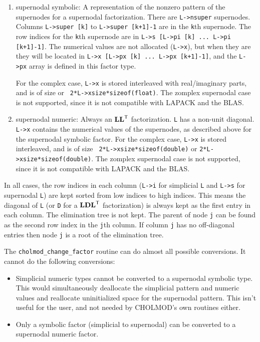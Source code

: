 \documentclass[11pt]{article}
\newcommand{\m}[1]{{\bf{#1}}}       %
\newcommand{\tr}{^{\sf T}}          %
\begin{document}
\begin{enumerate}
\item supernodal symbolic:  A representation of the nonzero pattern of the
    supernodes for a supernodal factorization.  There are {\tt L->nsuper}
    supernodes.  Columns {\tt L->super [k]} to {\tt L->super [k+1]-1} are in
    the {\tt k}th supernode.  The row indices for the {\tt k}th supernode are
    in {\tt L->s [L->pi [k] ... L->pi [k+1]-1]}.  The numerical values are not
    allocated ({\tt L->x}), but when they are they will be located in {\tt L->x
    [L->px [k] ... L->px [k+1]-1]}, and the {\tt L->px} array is defined in
    this factor type.

    For the complex case, {\tt L->x} is stored interleaved with real/imaginary
    parts, and is of size  or {\tt
    2*L->xsize*sizeof(float)}. The zomplex supernodal case is not
    supported, since it is not compatible with LAPACK and the BLAS.

\item supernodal numeric:  Always an $\m{LL}\tr$ factorization.  {\tt L} has a
    non-unit diagonal.  {\tt L->x} contains the numerical values of the
    supernodes, as described above for the supernodal symbolic factor.  For the
    complex case, {\tt L->x} is stored interleaved, and is of size {\tt
    2*L->xsize*sizeof(double)} or {\tt 2*L->xsize*sizeof(double)}.  The zomplex
    supernodal case is not supported, since it is not compatible with LAPACK
    and the BLAS.

\end{enumerate}


In all cases, the row indices in each column ({\tt L->i} for simplicial {\tt L}
and {\tt L->s} for supernodal {\tt L}) are kept sorted from low indices to high
indices.  This means the diagonal of {\tt L} (or {\tt D} for a $\m{LDL}\tr$
factorization) is always kept as the first entry in each column.  The
elimination tree is not kept.  The parent of node {\tt j} can be found as the
second row index in the {\tt j}th column.  If column {\tt j} has no
off-diagonal entries then node {\tt j} is a root of the elimination tree.

The {\tt cholmod\_change\_factor} routine can do almost all possible
conversions.  It cannot do the following conversions:

\begin{itemize}
\item Simplicial numeric types cannot be converted to a supernodal
    symbolic type.  This would simultaneously deallocate the
    simplicial pattern and numeric values and reallocate uninitialized
    space for the supernodal pattern.  This isn't useful for the user,
    and not needed by CHOLMOD's own routines either.
\item Only a symbolic factor (simplicial to supernodal) can be converted
    to a supernodal numeric factor.
\end{itemize}
\end{document}
